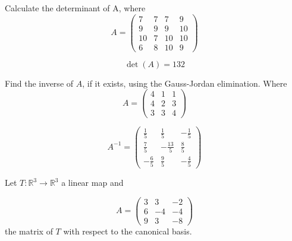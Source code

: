 \begin{questions}

\question Calculate the determinant of A, where
$$
A=\left(\begin{array}{rrrr}
7 & 7 & 7 & 9 \\
9 & 9 & 9 & 10 \\
10 & 7 & 10 & 10 \\
6 & 8 & 10 & 9
\end{array}\right)
$$

\begin{solution}
$$\det(A)=132$$
\end{solution}

\question Find the inverse of $A$, if it exists, using the Gauss-Jordan elimination. Where
$$
A=\left(\begin{array}{rrr}
4 & 1 & 1 \\
4 & 2 & 3 \\
3 & 3 & 4
\end{array}\right)
$$

\begin{solution}
$$A^{-1}=\left(\begin{array}{rrr}
\frac{1}{5} & \frac{1}{5} & -\frac{1}{5} \\
\frac{7}{5} & -\frac{13}{5} & \frac{8}{5} \\
-\frac{6}{5} & \frac{9}{5} & -\frac{4}{5}
\end{array}\right)$$
\end{solution}

\question Let $T:\mathbb{R}^3\rightarrow\mathbb{R}^3$  a linear map and
 
$$
A=\left(\begin{array}{rrr}
3 & 3 & -2 \\
6 & -4 & -4 \\
9 & 3 & -8
\end{array}\right)
$$
the matrix of $T$ with respect to the canonical basis.
\end{questions}
